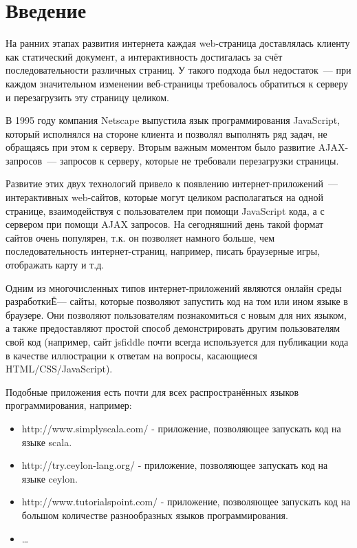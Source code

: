 \chapter*{Введение}

	На ранних этапах развития интернета каждая web-страница доставлялась клиенту как статический документ, а интерактивность достигалась за счёт последовательности различных страниц. У такого подхода был недостаток~--- при каждом значительном изменении веб-страницы требовалось обратиться к серверу и перезагрузить эту страницу целиком. 

	В 1995 году компания Netscape выпустила язык программирования 
Java\-Script, который исполнялся на стороне клиента и позволял выполнять ряд задач, не обращаясь при этом к серверу. Вторым важным моментом было развитие AJAX-запросов~--- запросов к серверу, которые не требовали перезагрузки страницы. 
	
	Развитие этих двух технологий привело к появлению интернет-приложе\-ний~--- интерактивных web-сайтов, которые могут целиком располагаться на одной странице,  взаимодействуя с пользователем при помощи JavaScript кода, а с сервером при помощи AJAX запросов. На сегодняшний день такой формат сайтов очень популярен, т.к. он позволяет намного больше, чем последовательность интернет-страниц, например, писать браузерные игры, отображать карту и т.д.
	
	Одним из многочисленных типов интернет-приложений являются онлайн среды разработкиЁ--- сайты, которые позволяют запустить код на том или ином языке в браузере. Они позволяют пользователям познакомиться с новым для них языком, а также предоставляют простой способ демонстрировать другим пользователям свой код (например, сайт jsfiddle почти всегда используется для публикации кода в качестве иллюстрации к ответам на вопросы, касающиеся HTML/CSS/JavaScript).
	
	Подобные приложения есть почти для всех распространённых языков программирования, например:
\begin{itemize}
	\item http://www.simplyscala.com/ - приложение, позволяющее запускать код на языке scala. 
	\item http://try.ceylon-lang.org/ - приложение, позволяющее запускать код на языке ceylon.
	\item http://www.tutorialspoint.com/ - приложение, позволяющее запускать код на большом количестве разнообразных языков программирования.
	\item \dots
\end{itemize}


